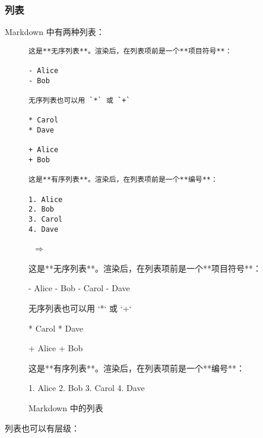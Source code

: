 \documentclass[a4paper,fontset=none]{ctexart}
\begin{document}
\subsubsection{列表}

Markdown 中有两种列表：

\begin{figure}[H]
    \centering
    \begin{minipage}{0.45\textwidth}
        \begin{verbatim}
这是**无序列表**。渲染后，在列表项前是一个**项目符号**：

- Alice
- Bob

无序列表也可以用 `*` 或 `+`

* Carol
* Dave

+ Alice
+ Bob

这是**有序列表**。渲染后，在列表项前是一个**编号**：

1. Alice
2. Bob
3. Carol
4. Dave
        \end{verbatim}
    \end{minipage}
    \, $\Longrightarrow$ \,
    \begin{minipage}{0.45\textwidth}
\begin{markdown}
这是**无序列表**。渲染后，在列表项前是一个**项目符号**：

- Alice
- Bob
- Carol
- Dave

无序列表也可以用 `*` 或 `+`

* Carol
* Dave

+ Alice
+ Bob

这是**有序列表**。渲染后，在列表项前是一个**编号**：

1. Alice
2. Bob
3. Carol
4. Dave
\end{markdown}
    \end{minipage}
    \caption{Markdown 中的列表}
\end{figure}

列表也可以有层级：
\end{document}

